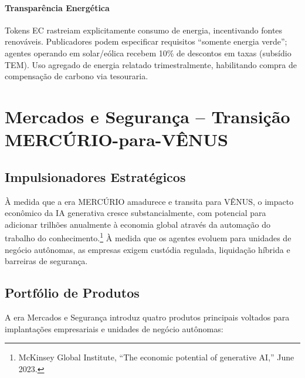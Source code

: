 \documentclass[11pt]{article}
\begin{document}
\paragraph{Transparência Energética} Tokens EC rastreiam explicitamente consumo de energia, incentivando fontes renováveis. Publicadores podem especificar requisitos ``somente energia verde''; agentes operando em solar/eólica recebem 10\% de descontos em taxas (subsídio TEM). Uso agregado de energia relatado trimestralmente, habilitando compra de compensação de carbono via tesouraria.

\section{Mercados e Segurança -- Transição MERCÚRIO-para-VÊNUS}
\subsection{Impulsionadores Estratégicos}
À medida que a era MERCÚRIO amadurece e transita para VÊNUS, o impacto econômico da IA generativa cresce substancialmente, com potencial para adicionar trilhões anualmente à economia global através da automação do trabalho do conhecimento.\footnote{McKinsey Global Institute, ``The economic potential of generative AI,'' June 2023.} À medida que os agentes evoluem para unidades de negócio autônomas, as empresas exigem custódia regulada, liquidação híbrida e barreiras de segurança.

\subsection{Portfólio de Produtos}
A era Mercados e Segurança introduz quatro produtos principais voltados para implantações empresariais e unidades de negócio autônomas:
\end{document}
